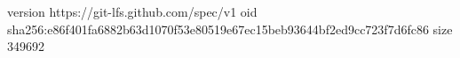 version https://git-lfs.github.com/spec/v1
oid sha256:e86f401fa6882b63d1070f53e80519e67ec15beb93644bf2ed9cc723f7d6fc86
size 349692
